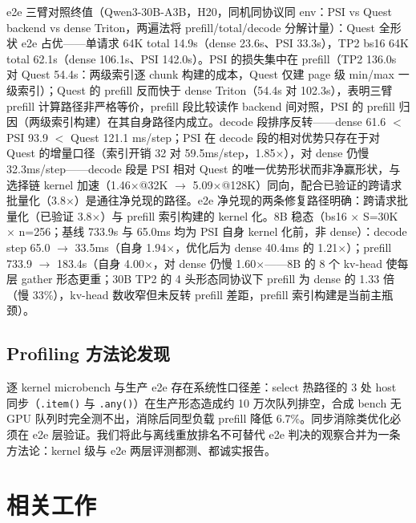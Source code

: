 \documentclass[11pt]{article}
\begin{document}
e2e 三臂对照终值（Qwen3-30B-A3B，H20，同机同协议同 env：PSI vs Quest backend vs dense Triton，两遍法将 prefill/total/decode 分解计量）：Quest 全形状 e2e 占优——单请求 64K total 14.9s（dense 23.6s、PSI 33.3s），TP2 bs16 64K total 62.1s（dense 106.1s、PSI 142.0s）。PSI 的损失集中在 prefill（TP2 136.0s 对 Quest 54.4s：两级索引逐 chunk 构建的成本，Quest 仅建 page 级 min/max 一级索引）；Quest 的 prefill 反而快于 dense Triton（54.4s 对 102.3s），表明三臂 prefill 计算路径非严格等价，prefill 段比较读作 backend 间对照，PSI 的 prefill 归因（两级索引构建）在其自身路径内成立。decode 段排序反转——dense 61.6 $<$ PSI 93.9 $<$ Quest 121.1 ms/step；PSI 在 decode 段的相对优势只存在于对 Quest 的增量口径（索引开销 32 对 59.5ms/step，1.85$\times$），对 dense 仍慢 32.3ms/step——decode 段是 PSI 相对 Quest 的唯一优势形状而非净赢形状，与选择链 kernel 加速（1.46$\times$@32K $\rightarrow$ 5.09$\times$@128K）同向，配合已验证的跨请求批量化（3.8$\times$）是通往净兑现的路径。e2e 净兑现的两条修复路径明确：跨请求批量化（已验证 3.8$\times$）与 prefill 索引构建的 kernel 化。8B 稳态（bs16 $\times$ S=30K $\times$ n=256；基线 733.9s 与 65.0ms 均为 PSI 自身 kernel 化前，非 dense）：decode step 65.0 $\rightarrow$ 33.5ms（自身 1.94$\times$，优化后为 dense 40.4ms 的 1.21$\times$）；prefill 733.9 $\rightarrow$ 183.4s（自身 4.00$\times$，对 dense 仍慢 1.60$\times$——8B 的 8 个 kv-head 使每层 gather 形态更重；30B TP2 的 4 头形态同协议下 prefill 为 dense 的 1.33 倍（慢 33\%），kv-head 数收窄但未反转 prefill 差距，prefill 索引构建是当前主瓶颈）。

\subsection{Profiling 方法论发现}

逐 kernel microbench 与生产 e2e 存在系统性口径差：select 热路径的 3 处 host 同步（\texttt{.item()} 与 \texttt{.any()}）在生产形态造成约 10 万次队列排空，合成 bench 无 GPU 队列时完全测不出，消除后同型负载 prefill 降低 6.7\%。同步消除类优化必须在 e2e 层验证。我们将此与离线重放排名不可替代 e2e 判决的观察合并为一条方法论：kernel 级与 e2e 两层评测都测、都诚实报告。

\section{相关工作}
\end{document}

